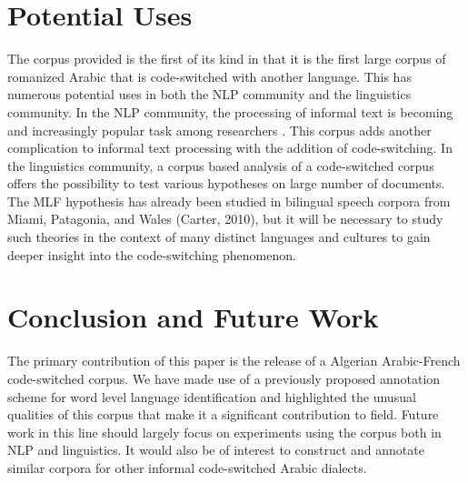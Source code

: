 \documentclass[10pt, a4paper]{article}
\begin{document}
\section{Potential Uses}
The corpus provided is the first of its kind in that it is the first
large corpus of romanized Arabic that is code-switched with another
language. This has numerous potential uses in both the NLP community
and the linguistics community. In the NLP community, the processing of
informal text is becoming and increasingly popular task among
researchers \cite{yang2013log}. This corpus adds another complication
to informal text processing with the addition of code-switching. In
the linguistics community, a corpus based analysis of a code-switched
corpus offers the possibility to test various hypotheses on large
number of documents. The MLF hypothesis has already been studied in
bilingual speech corpora from Miami, Patagonia, and Wales (Carter,
2010), but it will be necessary to study such theories in the context
of many distinct languages and cultures to gain deeper insight into
the code-switching phenomenon.


\section{Conclusion and Future Work}
The primary contribution of this paper is the release of a Algerian
Arabic-French code-switched corpus. We have made use of a previously
proposed annotation scheme for word level language identification and
highlighted the unusual qualities of this corpus that make it a
significant contribution to field. Future work in this line should
largely focus on experiments using the corpus both in NLP and
linguistics. It would also be of interest to construct and annotate
similar corpora for other informal code-switched Arabic dialects.




\end{document}
